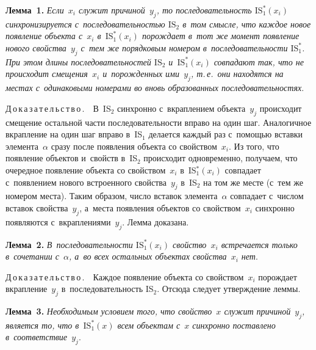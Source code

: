 \begin{multicols}{2}
  \smallskip
  
  \noindent
  \textbf{Лемма~1.} \textit{Если~$x_i$ служит причиной~$y_j$, то 
последовательность  $\mathrm{IS}_1^*(x_i)$ синхронизируется с~последовательностью 
$\mathrm{IS}_2$ в~том смысле, что каждое новое появление объекта  с~$x_i$ 
в~$\mathrm{IS}_1^*(x_i)$  порождает в~тот же момент появление нового свойства~$y_j$ 
с~тем же порядковым номером в~последовательности $\mathrm{IS}_1^*$. При этом длины 
последовательностей $\mathrm{IS}_2$ и~$\mathrm{IS}_1^*(x_i)$ совпадают так, что не происходит 
смещения~$x_i$ и~порожденных ими~$y_j$, т.\,е.\ они находятся на местах 
с~одинаковыми номерами во вновь образованных последовательностях}.
  
  \smallskip
  
  \noindent
  Д\,о\,к\,а\,з\,а\,т\,е\,л\,ь\,с\,т\,в\,о\,.\ \  В~IS$_2$ синхронно с~вкраплением 
объекта~$y_j$ происходит смещение остальной части последовательности вправо 
на один шаг. Аналогичное вкрапление на один шаг вправо в~IS$_1$ делается 
каждый раз с~по\-мощью вставки элемента~$\alpha$ сразу после появления объекта 
со свойством~$x_i$. Из того, что появление объектов  и~свойств в~IS$_2$ 
происходит одновременно, получаем, что очередное появление объекта со 
свойством~$x_i$ в~IS$_1^*(x_i)$ совпадает с~появлением нового встроенного 
свойства~$y_j$ в~IS$_2$ на том же месте (с~тем же номером места). Таким 
образом, число вставок элемента~$\alpha$ совпадает с~числом вставок 
свойства~$y_j$, а~места появления объектов со свойством~$x_i$ синхронно 
появляются с~вкраплениями~$y_j$. Лемма доказана.
  
  \smallskip
  
  \noindent
  \textbf{Лемма~2.} \textit{В~последовательности $\mathrm{IS}_1^*(x_i)$ свойство~$x_i$ 
встречается только в~сочетании с~$\alpha$, а~во всех остальных объектах 
свойства~$x_i$ нет}.
  
  \smallskip
  
  \noindent
  Д\,о\,к\,а\,з\,а\,т\,е\,л\,ь\,с\,т\,в\,о\,.\ \  Каждое появление объекта со 
свойством~$x_i$ порождает вкрапление~$y_j$ в~последовательность IS$_2$. 
Отсюда следует утверждение леммы.
  
  \bigskip
  
  
  \noindent
  \textbf{Лемма~3.} \textit{Необходимым условием того, что свойство~$x$ 
служит причиной~$y_j$, является то, что в~$\mathrm{IS}_1^* (x)$ всем объектам с~$x$ 
синхронно поставлено в~соответствие~$y_j$}.
  
  \bigskip
  

\end{multicols}
